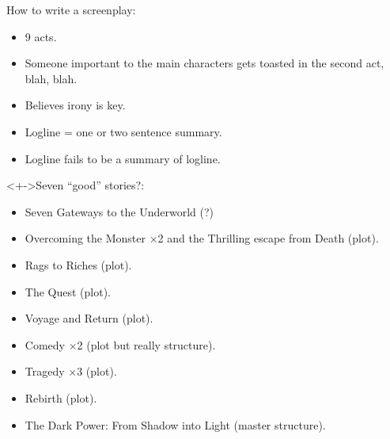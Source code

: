 \begin{frame}

  \begin{block}{How to write a screenplay:}
    \begin{itemize}
    \item<+-> 
      9 acts.
    \item<+-> 
      Someone important to the main characters gets
      toasted in the second act, blah, blah.
    \item<+-> 
      Believes irony is key.
    \item<+-> 
      Logline = one or two sentence summary.
    \item<+-> 
      Logline fails to be a summary of logline.
    \end{itemize}
  \end{block}

\end{frame}


\begin{frame}

  \begin{block}<+->{Seven ``good'' stories?:}
    \begin{itemize}
    \item<+->
      Seven Gateways to the Underworld (?)
    \item<+->
      Overcoming the Monster $\times$2 and the Thrilling escape from
      Death (plot).
    \item<+->
      Rags to Riches (plot).
    \item<+->
      The Quest (plot).
    \item<+->
      Voyage and Return (plot).
    \item<+->
      Comedy $\times$2 (plot but really structure).
    \item<+->
      Tragedy $\times$3 (plot).
    \item<+->
      Rebirth (plot).
    \item<+->
      The Dark Power: From Shadow into Light (master structure).
    \end{itemize}

  \end{block}

\end{frame}

